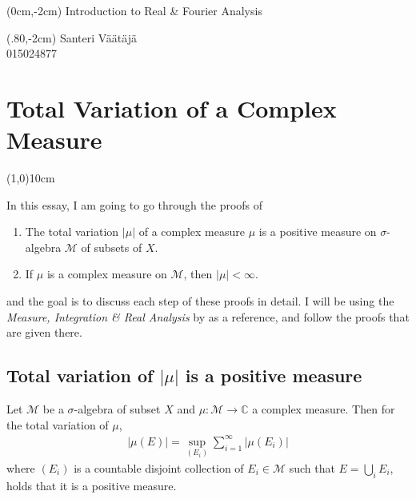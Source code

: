\documentclass[12pt]{artikel1}
\begin{document}
\begin{textblock*}{250mm}(0cm,-2cm)
\noindent Introduction to Real \& Fourier Analysis
\end{textblock*}
\begin{textblock*}{250mm}(.80\textwidth,-2cm)
\noindent Santeri Väätäjä \\ 015024877
\end{textblock*}
\vspace*{-2cm}
\section*{Total Variation of a Complex Measure}
\vspace*{-.5cm}
\line(1,0){10cm}
\vspace*{.5cm}

\noindent In this essay, I am going to go through the proofs of

\begin{enumerate}
    \item The total variation $|\mu|$ of a complex measure $\mu$ is a positive measure on $\sigma$-algebra $\mathcal{M}$ of subsets of $X$.
    \item If $\mu$ is a complex measure on $\mathcal{M}$, then $|\mu|<\infty$.
\end{enumerate}

\noindent and the goal is to discuss each step of these proofs in detail. I will be using the \textit{Measure, Integration \& Real Analysis} by \autocite{axler_measure_2019} as a reference, and follow the proofs that are given there.

\subsection*{Total variation of $|\mu|$ is a positive measure}

\begin{proposition}[label=prop:var-is-measure]
    Let $\mathcal{M}$ be a $\sigma$-algebra of subset $X$ and $\mu:\mathcal{M}\rightarrow\mathbb{C}$ a complex measure. Then for the total variation of $\mu$,
    \begin{gather}\label{eq:variation_is_measure}
        |\mu(E)|=\sup_{(E_i)}\sum_{i=1}^\infty |\mu(E_i)|
    \end{gather}
    where $(E_i)$ is a countable disjoint collection of $E_i\in\mathcal{M}$ such that $E=\bigcup_iE_i$, holds that it is a positive measure.
\end{proposition}
\end{document}
